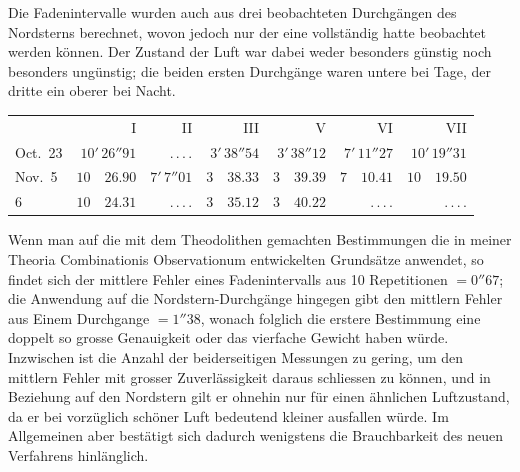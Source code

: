 Die Fadenintervalle wurden auch aus drei beobachteten Durchgängen des Nordsterns berechnet, wovon
jedoch nur der eine vollständig hatte beobachtet werden können. Der Zustand der Luft war dabei
weder besonders günstig noch besonders ungünstig; die beiden ersten Durchgänge waren untere bei
Tage, der dritte ein oberer bei Nacht.

\begin{center}
\begingroup\small\setlength{\tabcolsep}{4pt}
\begin{tabular}{l|r|r|r|r|r|r}
 & I & II & III & V & VI & VII \\
Oct.\ 23 & $10'\,26''91$ & .\,.\,.\,. & $3'\,38''54$ & $3'\,38''12$ & $7'\,11''27$ & $10'\,19''31$ \\
Nov.\ 5 & $10\quad26.90$ & $7'\,7''01$ & $3\quad38.33$ & $3\quad39.39$ & $7\quad10.41$ & $10\quad19.50$ \\
\phantom{Nov.\ }6 & $10\quad24.31$ & .\,.\,.\,. & $3\quad35.12$ & $3\quad40.22$ & .\,.\,.\,. & .\,.\,.\,. \\
\end{tabular}
\endgroup
\end{center}

Wenn man auf die mit dem Theodolithen gemachten Bestimmungen die in meiner Theoria
Combinationis Observationum entwickelten Grundsätze anwendet, so findet sich der mittlere Fehler
eines Fadenintervalls aus 10 Repetitionen $= 0''67$; die Anwendung auf die
Nordstern-Durchgänge hingegen gibt den mittlern Fehler aus Einem Durchgange $= 1''38$, wonach
folglich die erstere Bestimmung eine doppelt so grosse Genauigkeit oder das vierfache Gewicht haben
würde. Inzwischen ist die Anzahl der
%
beiderseitigen Messungen zu gering, um den mittlern Fehler mit grosser Zuverlässigkeit daraus
schliessen zu können, und in Beziehung auf den Nordstern gilt er ohnehin nur für einen ähnlichen
Luftzustand, da er bei vorzüglich schöner Luft bedeutend kleiner ausfallen würde. Im Allgemeinen aber
bestätigt sich dadurch wenigstens die Brauchbarkeit des neuen Verfahrens hinlänglich.

